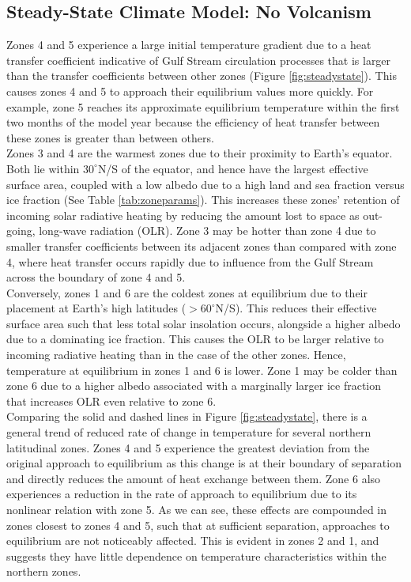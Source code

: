 \documentclass[12pt]{article}
\begin{document}
\subsection{Steady-State Climate Model: No Volcanism}
\label{section:steadystate}
Zones 4 and 5 experience a large initial temperature gradient due to a heat
transfer coefficient indicative of Gulf Stream circulation processes that is
larger than the transfer coefficients between other zones
(Figure \ref{fig:steadystate}). This causes zones 4 and 5 to approach their
equilibrium values more quickly. For example, zone 5 reaches its approximate
equilibrium temperature within the first two months of the model year because
the efficiency of heat transfer between these zones is greater than between
others. \\

Zones 3 and 4 are the warmest zones due to their proximity to Earth's equator.
Both lie within $30^{\circ}$N/S of the equator, and hence have the largest
effective surface area, coupled with a low albedo due to a high land and sea
fraction versus ice fraction (See Table \ref{tab:zoneparams}). This increases
these zones' retention of incoming solar radiative heating by reducing the
amount lost to space as out-going, long-wave radiation (OLR). Zone 3 may be
hotter than zone 4 due to smaller transfer coefficients between its adjacent
zones than compared with zone 4, where heat transfer occurs rapidly due to
influence from the Gulf Stream across the boundary of zone 4 and 5. \\

Conversely, zones 1 and 6 are the coldest zones at equilibrium due to their
placement at Earth's high latitudes ($>60^{\circ}$N/S). This reduces their
effective surface area such that less total solar insolation occurs, alongside
a higher albedo due to a dominating ice fraction. This causes the OLR to be
larger relative to incoming radiative heating than in the case of the other
zones. Hence, temperature at equilibrium in zones 1 and 6 is lower. Zone 1 may
be colder than zone 6 due to a higher albedo associated with a marginally larger
ice fraction that increases OLR even relative to zone 6. \\

Comparing the solid and dashed lines in Figure \ref{fig:steadystate}, there is a
general trend of reduced rate of change in temperature for several northern 
latitudinal zones. Zones 4 and 5 experience the greatest deviation from the
original approach to equilibrium as this change is at their boundary of
separation and directly reduces the amount of heat exchange between them.
Zone 6 also experiences a reduction in the rate of approach to equilibrium due
to its nonlinear relation with zone 5. As we can see, these effects are
compounded in zones closest to zones 4 and 5, such that at sufficient
separation, approaches to equilibrium are not noticeably affected. This is
evident in zones 2 and 1, and suggests they have little dependence on
temperature characteristics within the northern zones. 
\end{document}
